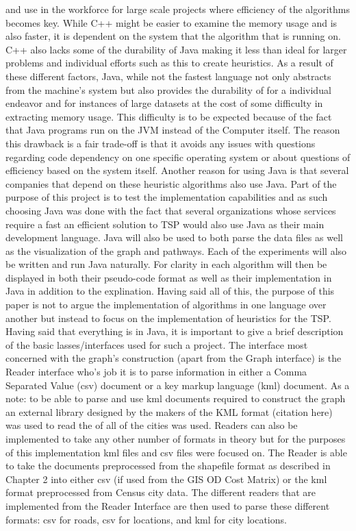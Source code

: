 \documentclass[midd]{thesis}
\newcommand{\tab}{\hspace*{2em}}
\begin{document}
and use in the workforce for large scale projects where efficiency of the algorithms becomes key.  While C++ might be easier to examine the memory usage and is also faster, it is dependent on the system that the algorithm that is running on. C++ also lacks some of the durability of Java making it less than ideal for larger problems and individual efforts such as this to create heuristics. As a result of these different factors, Java, while not the fastest language not only abstracts from the machine's system but also provides the durability of for a individual endeavor and for instances of large datasets at the cost of some difficulty in extracting memory usage. This difficulty is to be expected because of the fact that Java programs run on the JVM instead of the Computer itself. The reason this drawback is a fair trade-off is that it avoids any issues with questions regarding code dependency on one specific operating system or about questions of efficiency based on the system itself. Another reason for using Java is that several companies that depend on these heuristic algorithms also use Java. Part of the purpose of this project is to test the implementation capabilities and as such choosing Java was done with the fact that several organizations whose services require a fast an efficient solution to TSP would also use Java as their main development language. Java will also be  used to both parse the data files as well as the visualization of the graph and pathways. Each of the experiments will also be written and run Java naturally. For clarity in each algorithm will then  be displayed in both their pseudo-code format as well as their implementation in Java in addition to the  explination. Having said all of this, the purpose of this paper is not to argue the implementation of algorithms in one language over another but instead to focus on the implementation of heuristics for the TSP.\\
\tab Having said that everything is in Java, it is important to give a brief description of the basic lasses/interfaces used for such a project. The interface most concerned with the graph's construction (apart from the Graph interface) is the Reader interface who's job it is to parse information in either a Comma Separated Value (csv) document or a key markup language (kml) document. As a note: to be able to parse and use kml documents required to construct the graph an external library designed by the makers of the KML format (citation here) was used to read the of all of the cities was used. Readers can also be implemented to take any other number of formats in theory but for the purposes of this implementation kml files and csv files were focused on. The Reader is able to take the documents preprocessed from the shapefile format as described in Chapter 2 into either csv (if used from the GIS OD Cost Matrix) or the kml format preprocessed from Census city data. The different readers that are implemented from the Reader Interface are then used to parse these different formats: csv for roads, csv for locations, and kml for city locations.\\
\end{document}
